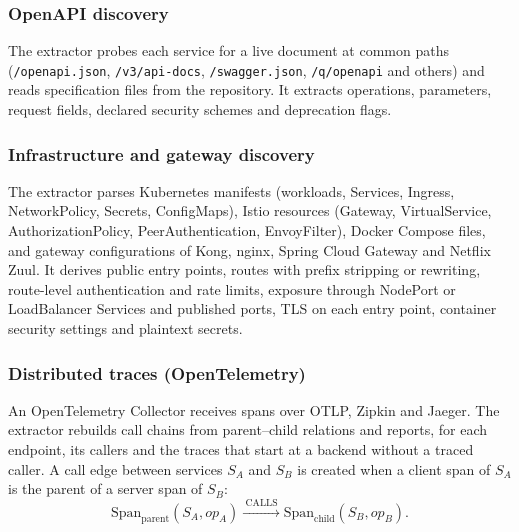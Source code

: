 \documentclass[conference]{IEEEtran}
\begin{document}
\subsubsection{OpenAPI discovery}
The extractor probes each service for a live document at common paths (\texttt{/openapi.json}, \texttt{/v3/api-docs}, \texttt{/swagger.json}, \texttt{/q/openapi} and others) and reads specification files from the repository. It extracts operations, parameters, request fields, declared security schemes and deprecation flags.

\subsubsection{Infrastructure and gateway discovery}
The extractor parses Kubernetes manifests (workloads, Services, Ingress, NetworkPolicy, Secrets, ConfigMaps), Istio resources (Gateway, VirtualService, AuthorizationPolicy, PeerAuthentication, EnvoyFilter), Docker Compose files, and gateway configurations of Kong, nginx, Spring Cloud Gateway and Netflix Zuul. It derives public entry points, routes with prefix stripping or rewriting, route-level authentication and rate limits, exposure through NodePort or LoadBalancer Services and published ports, TLS on each entry point, container security settings and plaintext secrets.

\subsubsection{Distributed traces (OpenTelemetry)}
An OpenTelemetry Collector \cite{otel} receives spans over OTLP, Zipkin and Jaeger. The extractor rebuilds call chains from parent--child relations and reports, for each endpoint, its callers and the traces that start at a backend without a traced caller. A call edge between services $S_A$ and $S_B$ is created when a client span of $S_A$ is the parent of a server span of $S_B$:
\begin{equation}
\mathrm{Span}_{\mathrm{parent}}(S_A,\mathit{op}_A) \xrightarrow{\ \mathrm{CALLS}\ } \mathrm{Span}_{\mathrm{child}}(S_B,\mathit{op}_B).
\label{eq:calls}
\end{equation}
\end{document}

